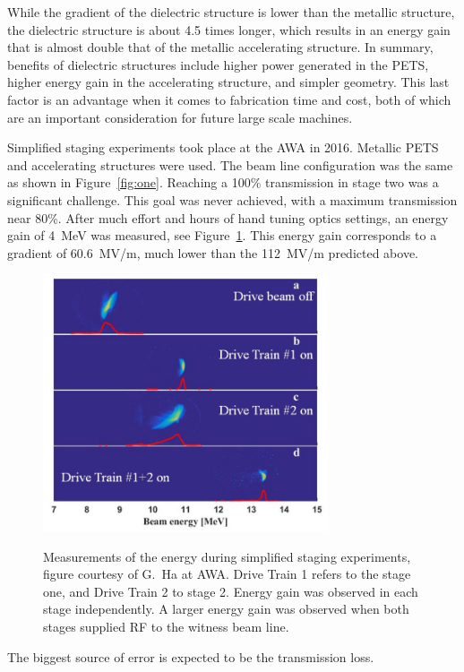 While the gradient of the dielectric structure is lower than the metallic structure, the dielectric 
structure is about 4.5 times longer, which results in an energy gain that is 
almost double that of the metallic accelerating structure.
In summary, benefits of dielectric structures include higher power
generated in the PETS, higher energy gain in the accelerating structure, 
and simpler geometry. This last factor is an advantage when it comes 
to fabrication time and cost, both of which are an important consideration for future large scale machines. 



Simplified staging experiments took place at the AWA in 2016. 
Metallic PETS and accelerating structures were used. 
The beam line configuration was the same as shown in Figure~\ref{fig:one}.
Reaching a 100\% transmission in stage two was a significant challenge.
This goal was never achieved, with a maximum transmission near 80\%. 
After much effort and hours of hand tuning optics settings, 
an energy gain of \SI{4}{MeV} was measured, see Figure~\ref{fig:old-tba}. 
This energy gain corresponds to a 
gradient of \SI{60.6}{MV/m}, much lower than the \SI{112}{MV/m} predicted above.
\begin{figure}
	\centering
	\includegraphics[width=0.75\textwidth]{images/old_tba}
	\label{fig:old-tba}
	\caption{Measurements of the energy during simplified staging experiments, 
		figure courtesy of G.~Ha at AWA.
		Drive Train 1 refers to the stage one, and Drive Train 2 to stage 2. 
		Energy gain was observed in each stage independently.
		A larger energy gain was observed when both stages supplied RF to the witness beam line.}
\end{figure}
The biggest source of error is expected to be the transmission loss. 




